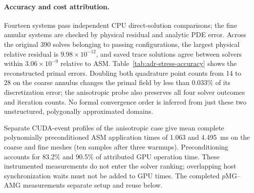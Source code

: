 \paragraph{Accuracy and cost attribution.}
Fourteen systems pass independent CPU direct-solution comparisons;
the fine annular systems are checked by physical residual and analytic PDE
error. Across the original 390 solves belonging to passing configurations, the largest
physical relative residual is $9.98\times10^{-12}$, and saved trace solutions
agree between solvers within $3.06\times10^{-9}$ relative to ASM.
Table~\ref{tab:adr-stress-accuracy} shows the reconstructed primal errors.
Doubling both quadrature point counts from 14 to 28 on the coarse annulus changes the
primal field by less than $0.033\%$ of its discretization error; the anisotropic
probe also preserves all four solver outcomes and iteration counts.
No formal convergence order is inferred from just these two unstructured,
polygonally approximated domains.

\begin{table}[htbp]
 \centering\small
 
 \caption{polynomially preconditioned ASM primal $L^2$ error on the 6,114- and 22,825-triangle annuli,
 both at $p=6$. Independent coarse direct solves give matching errors.}
 \label{tab:adr-stress-accuracy}
\end{table}

Separate CUDA-event profiles of the anisotropic case give mean complete
polynomially preconditioned ASM application times of 1.063 and 4.495~ms on the coarse and fine meshes
(ten samples after three warmups). Preconditioning accounts for 83.2\% and
90.5\% of attributed GPU operation time. These instrumented measurements do
not enter the solver ranking; overlapping host synchronization waits must not
be added to GPU times. The completed $p$MG--AMG measurements separate setup and reuse below.

\begin{table}[!htbp]
 \centering\scriptsize
 \setlength{\tabcolsep}{3pt}
 
 \caption{$p$MG--AMG completion of every initial system, including the coefficient
 and source controls. Fresh and reused columns independently select the fastest
 passing policy; S/R denote standard/robust, and iterations belong to the reused
 winner. NC means neither policy passes. Every reused solve starts from zero.}
 \label{tab:adr-initial-native}
\end{table}
